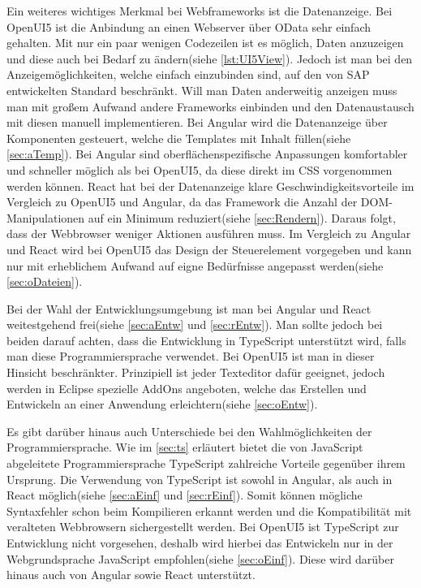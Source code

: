 Ein weiteres wichtiges Merkmal bei Webframeworks ist die Datenanzeige. Bei OpenUI5 ist die Anbindung an einen Webserver über OData sehr einfach gehalten. Mit nur ein paar wenigen Codezeilen ist es möglich, Daten anzuzeigen und diese auch bei Bedarf zu ändern(siehe \autoref{lst:UI5View}). Jedoch ist man bei den Anzeigemöglichkeiten, welche einfach einzubinden sind, auf den von SAP entwickelten Standard beschränkt. Will man Daten anderweitig anzeigen muss man mit großem Aufwand andere Frameworks einbinden und den Datenaustausch mit diesen manuell implementieren. Bei Angular wird die Datenanzeige über Komponenten gesteuert, welche die Templates mit Inhalt füllen(siehe \autoref{sec:aTemp}). Bei Angular sind oberflächenspezifische Anpassungen komfortabler und schneller möglich als bei OpenUI5, da diese direkt im CSS vorgenommen werden können. React hat bei der Datenanzeige klare Geschwindigkeitsvorteile im Vergleich zu OpenUI5 und Angular, da das Framework die Anzahl der DOM-Manipulationen auf ein Minimum reduziert(siehe \autoref{sec:Rendern}). Daraus folgt, dass der Webbrowser weniger Aktionen ausführen muss. Im Vergleich zu Angular und React wird bei OpenUI5 das Design der Steuerelement vorgegeben und kann nur mit erheblichem Aufwand auf eigne Bedürfnisse angepasst werden(siehe \autoref{sec:oDateien}).  

Bei der Wahl der Entwicklungsumgebung ist man bei Angular und React weitestgehend frei(siehe \autoref{sec:aEntw} und \ref{sec:rEntw}). Man sollte jedoch bei beiden darauf achten, dass die Entwicklung in TypeScript unterstützt wird, falls man diese Programmiersprache verwendet. Bei OpenUI5 ist man in dieser Hinsicht beschränkter. Prinzipiell ist jeder Texteditor dafür geeignet, jedoch werden in Eclipse spezielle AddOns angeboten, welche das Erstellen und Entwickeln an einer Anwendung erleichtern(siehe \autoref{sec:oEntw}).

Es gibt darüber hinaus auch Unterschiede bei den Wahlmöglichkeiten der Programmiersprache. Wie im \autoref{sec:ts} erläutert bietet die von JavaScript abgeleitete Programmiersprache TypeScript zahlreiche Vorteile gegenüber ihrem Ursprung. Die Verwendung von TypeScript ist sowohl in Angular, als auch in React möglich(siehe \autoref{sec:aEinf} und \ref{sec:rEinf}). Somit können mögliche Syntaxfehler schon beim Kompilieren erkannt werden und die Kompatibilität mit veralteten Webbrowsern sichergestellt werden. Bei OpenUI5 ist TypeScript zur Entwicklung nicht vorgesehen, deshalb wird hierbei das Entwickeln nur in der Webgrundsprache JavaScript empfohlen(siehe \autoref{sec:oEinf}). Diese wird darüber hinaus auch von Angular sowie React unterstützt.

